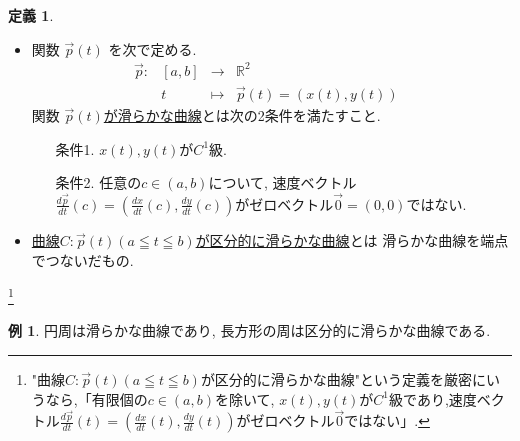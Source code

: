 \documentclass[dvipdfmx,a4paper,11pt]{article}
\newcommand{\R}{\mathbb{R}}
\theoremstyle{definition}
\newtheorem{dfn}[thm]{定義}
\newtheorem{exa}[thm]{例}
\newcommand{\drv}[2]{\frac{d #1}{d#2}}
\begin{document}
  \begin{tcolorbox}[
    colback = white,
    colframe = green!35!black,
    fonttitle = \bfseries,
    breakable = true]
    \begin{dfn}
    \text{}
    
    \begin{itemize}
\item 関数 $\vec{p}(t)$ を次で定める.
$$
\begin{array}{ccccc}
\vec{p}: &[a,b] & \rightarrow & \R^2 & \\
&t & \longmapsto &\vec{p}(t) = (x(t), y(t))&
\end{array}
$$
関数 \underline{$\vec{p}(t)$が滑らかな曲線}とは次の2条件を満たすこと.
\begin{enumerate}
\item[条件1.] $x(t),y(t)$が$C^1$級.
\item[条件2.]  任意の$c \in (a,b)$について, 速度ベクトル$\drv{\vec{p}}{t}(c)=\left( \drv{x}{t}(c),\drv{y}{t}(c)  \right)$がゼロベクトル$\vec{0} = (0,0)$ではない.
\end{enumerate}
\item \underline{曲線$C: \vec{p}(t) (a \leqq t \leqq b)$が区分的に滑らかな曲線}とは
滑らかな曲線を端点でつないだもの.

\end{itemize}
     \end{dfn}
 \end{tcolorbox}
 \footnote{"曲線$C: \vec{p}(t) (a \leqq t \leqq b)$が区分的に滑らかな曲線"という定義を厳密にいうなら,「有限個の$c \in (a,b)$を除いて, $x(t),y(t)$が$C^1$級であり,速度ベクトル$\drv{\vec{p}}{t}(t)=\left( \drv{x}{t}(t),\drv{y}{t}(t) \right)$がゼロベクトル$\vec{0}$ではない」.}
 
  \begin{exa}
円周は滑らかな曲線であり, 長方形の周は区分的に滑らかな曲線である.
 \end{exa}
 
\end{document}
